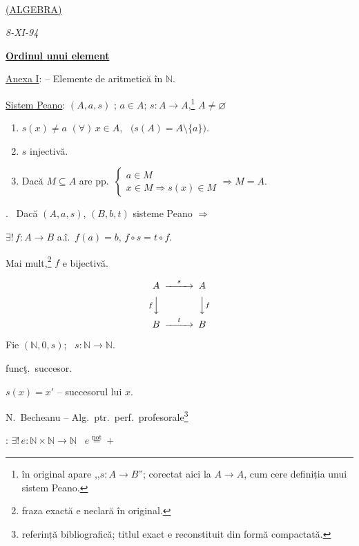\documentclass[12pt]{article}
\begin{document}
\begin{center}
\\[2pt]
\underline{(ALGEBRA)}
\end{center}
\begin{flushright}
\textit{8-XI-94}
\end{flushright}

\bigskip
\noindent\underline{\textbf{Ordinul unui element}}

\bigskip
\noindent\underline{Anexa I}: -- Elemente de aritmetică în $\mathbb{N}$.

\bigskip
\noindent\underline{Sistem Peano}: $(A,a,s)$ ; $a\in A$; $s:A\to A$,\footnote{în original apare ,,$s:A\to B$''; corectat aici la $A\to A$, cum cere definiția unui sistem Peano.} $A\neq\varnothing$

\begin{enumerate}
\item[1)] $s(x)\neq a$ $(\forall)\,x\in A$, \ $\big(s(A)=A\setminus\{a\}\big)$.
\item[2)] $s$ injectivă.
\item[3)] Dacă $M\subseteq A$ are pp.\ $\begin{cases} a\in M \\ x\in M \Rightarrow s(x)\in M \end{cases} \Rightarrow M=A$.
\end{enumerate}

\bigskip
\noindent{}. \ Dacă $(A,a,s)$, $(B,b,t)$ sisteme Peano $\Rightarrow$

\noindent $\exists!\, f:A\to B$ a.î.\ $f(a)=b$, $f\circ s = t\circ f$.

\noindent Mai mult,\footnote{fraza exactă e neclară în original.} $f$ e bijectivă.

\[
\begin{CD}
A @>s>> A\\
@VfVV @VVfV\\
B @>t>> B
\end{CD}
\]

\bigskip
\noindent Fie $(\mathbb{N},0,s)$; \ $s:\mathbb{N}\to\mathbb{N}$.

\noindent funcţ.\ succesor.

\noindent $s(x)=x'$ -- succesorul lui $x$.

\bigskip
\noindent N.\ Becheanu -- Alg.\ ptr.\ perf.\ profesorale\footnote{referință bibliografică; titlul exact e reconstituit din formă compactată.}

\bigskip
\noindent{}: $\exists!\, e:\mathbb{N}\times\mathbb{N}\to\mathbb{N}$ \ $e\overset{\text{not}}{=}+$
\end{document}
